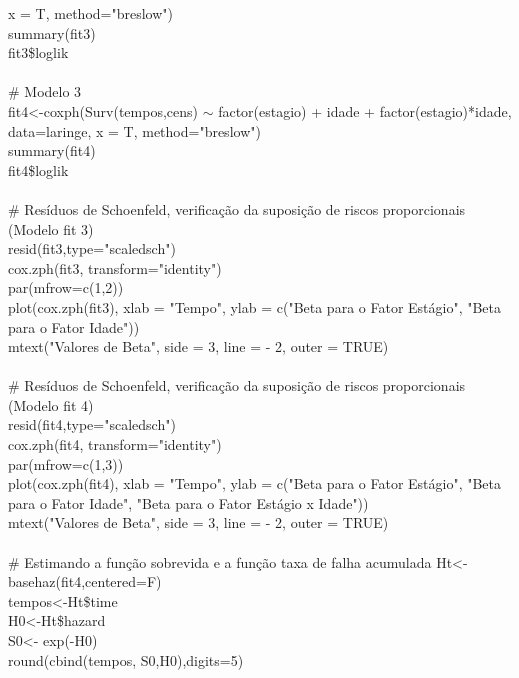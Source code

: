 \documentclass[12pt,a4paper]{article}
\begin{document}
 	x = T, method="breslow")\\
 	summary(fit3)\\
 	fit3\$loglik\\
 	\vspace{0.25cm}\\
 	\# Modelo 3\\
 	fit4<-coxph(Surv(tempos,cens) $\sim$ factor(estagio) + idade + factor(estagio)*idade,
 	data=laringe, x = T, method="breslow")\\
 	summary(fit4)\\
 	fit4\$loglik\\
 	\vspace{0.25cm}\\
 	\# Resíduos de Schoenfeld, verificação da suposição de riscos proporcionais (Modelo fit 3)\\
 	resid(fit3,type="scaledsch")\\
 	cox.zph(fit3, transform="identity")\\
 	par(mfrow=c(1,2))\\
 	plot(cox.zph(fit3), xlab = "Tempo", ylab = c("Beta para o Fator Estágio", "Beta para o Fator Idade"))\\
 	mtext("Valores de Beta", side = 3, line = - 2, outer = TRUE)\\
 	\vspace{0.25cm}\\
 	\# Resíduos de Schoenfeld, verificação da suposição de riscos proporcionais (Modelo fit 4)\\
 	resid(fit4,type="scaledsch")\\
 	cox.zph(fit4, transform="identity")\\
 	par(mfrow=c(1,3))\\
 	plot(cox.zph(fit4), xlab = "Tempo", ylab = c("Beta para o Fator Estágio", "Beta para o Fator Idade", "Beta para o Fator Estágio x Idade"))\\
 	mtext("Valores de Beta", side = 3, line = - 2, outer = TRUE)\\
 	\vspace{0.25cm}\\
 	\# Estimando a função sobrevida e a função taxa de falha acumulada
 	Ht<-basehaz(fit4,centered=F)\\
 	tempos<-Ht\$time\\
 	H0<-Ht\$hazard\\
 	S0<- exp(-H0)\\
 	round(cbind(tempos, S0,H0),digits=5)\\
 	\vspace{0.25cm}\\
\end{document}
